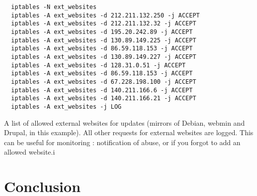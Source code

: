 \documentclass[a4paper,12pt]{article}
\begin{document}
\begin{verbatim}
  iptables -N ext_websites
  iptables -A ext_websites -d 212.211.132.250 -j ACCEPT
  iptables -A ext_websites -d 212.211.132.32 -j ACCEPT
  iptables -A ext_websites -d 195.20.242.89 -j ACCEPT
  iptables -A ext_websites -d 130.89.149.225 -j ACCEPT
  iptables -A ext_websites -d 86.59.118.153 -j ACCEPT
  iptables -A ext_websites -d 130.89.149.227 -j ACCEPT
  iptables -A ext_websites -d 128.31.0.51 -j ACCEPT
  iptables -A ext_websites -d 86.59.118.153 -j ACCEPT
  iptables -A ext_websites -d 67.228.198.100 -j ACCEPT
  iptables -A ext_websites -d 140.211.166.6 -j ACCEPT
  iptables -A ext_websites -d 140.211.166.21 -j ACCEPT
  iptables -A ext_websites -j LOG
\end{verbatim}

A list of allowed external websites for updates (mirrors of Debian, webmin and Drupal, in this example).
All other requests for external websites are logged. This can be useful for monitoring : notification of abuse, or if you forgot to add an allowed website.i

\section{Conclusion}
\end{document}
